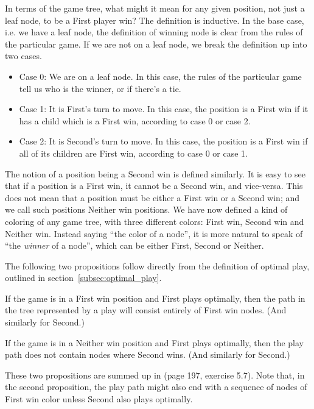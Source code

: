 In terms of the game tree, what might it mean for any given position, not just a leaf node, to be a First player win? The definition is inductive.
In the base case, i.e. we have a leaf node, the definition of winning node is clear from the rules of the particular game.
If we are not on a leaf node, we break the definition up into two cases.

\begin{definition}
\label{def:positionclasses}

\begin{itemize}

  \item Case 0: We are on a leaf node. In this case, the rules of the particular game tell us who is the winner, or if there's a tie.

  \item Case 1: It is First's turn to move. In this case, the position is a First win if it has a child which is a First win, according to case 0 or case 2.

  \item Case 2: It is Second's turn to move. In this case, the position is a First win if all of its children are First win, according to case 0 or case 1.

\end{itemize}

\end{definition}
The notion of a position being a Second win is defined similarly.
It is easy to see that if a position is a First win, it cannot be a Second win, and vice-versa.
This does not mean that a position must be either a First win or a Second win; and we call such positions Neither win positions.
We have now defined a kind of coloring of any game tree, with three different colors: First win, Second win and Neither win.
Instead saying ``the color of a node'', it is more natural to speak of ``the \emph{winner} of a node'', which can be either First, Second or Neither.

The following two propositions follow directly from the definition of optimal play, outlined in section~\ref{subsec:optimal_play}.

\begin{proposition}
If the game is in a First win position and First plays optimally, then the path in the tree represented by a play will consist entirely of First win nodes.
(And similarly for Second.)
\end{proposition}

\begin{proposition}
If the game is in a Neither win position and First plays optimally, then the play path does not contain nodes where Second wins.
(And similarly for Second.)
\end{proposition}
These two propositions are summed up in \citep{aimodernapproach} (page 197, exercise 5.7).
Note that, in the second proposition, the play path might also end with a sequence of nodes of First win color unless Second also plays optimally.

